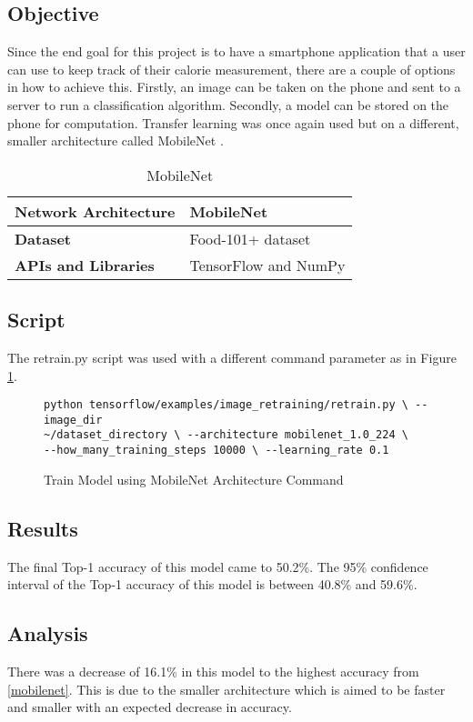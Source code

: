 \tocless\subsection{Objective}
Since the end goal for this project is to have a smartphone
application that a user can use to keep track of their calorie measurement,
there are a couple of options in how to achieve this. Firstly, an image can be
taken on the phone and sent to a server to run a classification algorithm.
Secondly, a model can be stored on the phone for computation. Transfer learning was once again used but on a different, smaller architecture called MobileNet \parencite{mobilenet}.

\begin{table}[h]
\centering
\caption{MobileNet}
\label{my-label}
\begin{tabular}{|l|p{8cm}|}
\hline
\textbf{Network Architecture} & MobileNet           \\ \hline
\textbf{Dataset}              & Food-101+ dataset \\ \hline
\textbf{APIs and Libraries}   & TensorFlow and NumPy                                                       \\ \hline
\end{tabular}
\end{table}

\tocless\subsection{Script}
The retrain.py script \parencite{retrainInception} was used with a different
command parameter as in Figure \ref{lst:mobilenetCommand}.

\begin{figure}[h]
\caption{Train Model using MobileNet Architecture Command}
\label{lst:mobilenetCommand}
\begin{lstlisting}[style=Command]
python tensorflow/examples/image_retraining/retrain.py \ --image_dir
~/dataset_directory \ --architecture mobilenet_1.0_224 \
--how_many_training_steps 10000 \ --learning_rate 0.1
\end{lstlisting}
\end{figure}

\tocless\subsection{Results}
The final Top-1 accuracy of this model came to 50.2\%.
The 95\% confidence interval of the Top-1 accuracy of this model is between 40.8\% and 59.6\%.

\tocless\subsection{Analysis}
There was a decrease of 16.1\% in this model to the highest accuracy from
\ref{mobilenet}. This is due to the smaller architecture which is aimed to be faster
and smaller with an expected decrease in accuracy.
